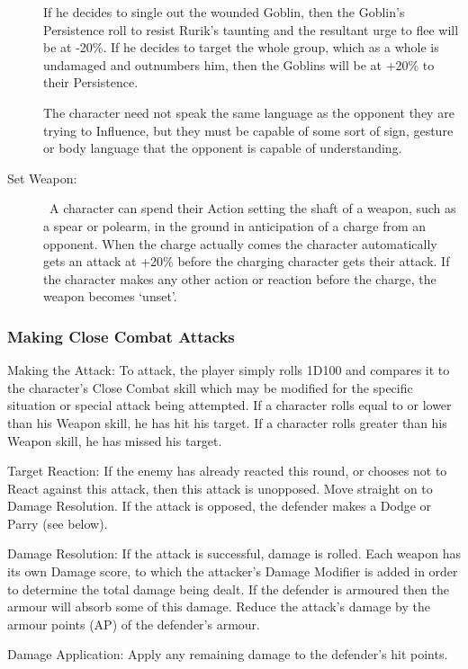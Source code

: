 \begin{description}
\begin{rpg-examplebox}
If he decides to single out the wounded Goblin, then the Goblin’s Persistence roll to resist Rurik’s taunting and the resultant urge to flee will be at -20\%. If he decides to target the whole group, which as a whole is undamaged and outnumbers him, then the Goblins will be at +20\% to their Persistence. 
	\end{rpg-examplebox}

The character need not speak the same language as the opponent they are trying to Influence, but they must be capable of some sort of sign, gesture or body language that the opponent is capable of understanding.

	\item[Set Weapon:]  A character can spend their Action setting the shaft of a weapon, such as a spear or polearm, in the ground in anticipation of a charge from an opponent. When the charge actually comes the character automatically gets an attack at +20\% before the charging character gets their attack. If the character makes any other action or reaction before the charge, the weapon becomes ‘unset’.
\end{description}


\subsubsection{Making Close Combat Attacks}
\begin{rpg-list}
\item Making the Attack: To attack, the player simply rolls 1D100 and compares it to the character’s Close Combat skill which may be modified for the specific situation or special attack being attempted. If a character rolls equal to or lower than his Weapon skill, he has hit his target. If a character rolls greater than his Weapon skill, he has missed his target. 

\item Target Reaction: If the enemy has already reacted this round, or chooses not to React against this attack, then this attack is unopposed. Move straight on to Damage Resolution. If the attack is opposed, the defender makes a Dodge or Parry (see below).

\item Damage Resolution: If the attack is successful, damage is rolled. Each weapon has its own Damage score, to which the attacker’s Damage Modifier is added in order to determine the total damage being dealt. If the defender is armoured then the armour will absorb some of this damage. Reduce the attack’s damage by the armour points (AP) of the defender’s armour. 

\item Damage Application: Apply any remaining damage to the defender’s hit points. 
\end{rpg-list}

